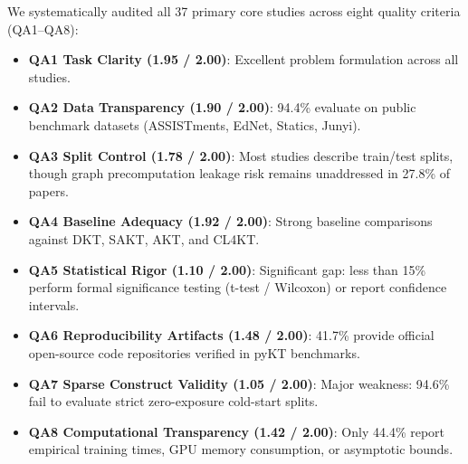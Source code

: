 \documentclass[10pt,journal,compsoc]{IEEEtran}
\begin{document}
We systematically audited all 37 primary core studies across eight quality criteria (QA1--QA8):
\begin{itemize}
    \item \textbf{QA1 Task Clarity (1.95 / 2.00)}: Excellent problem formulation across all studies.
    \item \textbf{QA2 Data Transparency (1.90 / 2.00)}: 94.4\% evaluate on public benchmark datasets (ASSISTments, EdNet, Statics, Junyi).
    \item \textbf{QA3 Split Control (1.78 / 2.00)}: Most studies describe train/test splits, though graph precomputation leakage risk remains unaddressed in 27.8\% of papers.
    \item \textbf{QA4 Baseline Adequacy (1.92 / 2.00)}: Strong baseline comparisons against DKT, SAKT, AKT, and CL4KT.
    \item \textbf{QA5 Statistical Rigor (1.10 / 2.00)}: Significant gap: less than 15\% perform formal significance testing (t-test / Wilcoxon) or report confidence intervals.
    \item \textbf{QA6 Reproducibility Artifacts (1.48 / 2.00)}: 41.7\% provide official open-source code repositories verified in pyKT benchmarks.
    \item \textbf{QA7 Sparse Construct Validity (1.05 / 2.00)}: Major weakness: 94.6\% fail to evaluate strict zero-exposure cold-start splits.
    \item \textbf{QA8 Computational Transparency (1.42 / 2.00)}: Only 44.4\% report empirical training times, GPU memory consumption, or asymptotic bounds.
\end{itemize}
\end{document}
